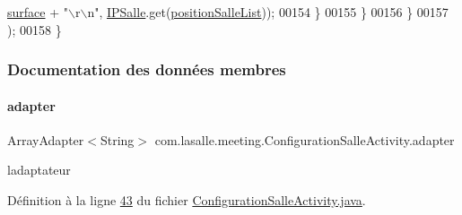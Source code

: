 \begin{DoxyCode}
      \hyperlink{classcom_1_1lasalle_1_1meeting_1_1_configuration_salle_activity_a3d27df453e9f461eb7402a8f69ca7ae1}{surface} + \textcolor{stringliteral}{"\(\backslash\)r\(\backslash\)n"}, \hyperlink{classcom_1_1lasalle_1_1meeting_1_1_configuration_salle_activity_a74bb868ae39746bae6533c1735207abf}{IPSalle}.get(\hyperlink{classcom_1_1lasalle_1_1meeting_1_1_configuration_salle_activity_ae76edfdd5b57cd474cccb830950f864a}{positionSalleList}));
00154                     \}
00155                 \}
00156             \}
00157         );
00158     \}
\end{DoxyCode}


\subsubsection{Documentation des données membres}
\mbox{\label{classcom_1_1lasalle_1_1meeting_1_1_configuration_salle_activity_a168dba575f6638ba8c9081dad1b55a6e}} 
\paragraph{\texorpdfstring{adapter}{adapter}}
{\footnotesize\ttfamily Array\+Adapter$<$String$>$ com.\+lasalle.\+meeting.\+Configuration\+Salle\+Activity.\+adapter\hspace{0.3cm}{\ttfamily [private]}}



l\textquotesingle{}adaptateur 



Définition à la ligne \hyperlink{_configuration_salle_activity_8java_source_l00043}{43} du fichier \hyperlink{_configuration_salle_activity_8java_source}{Configuration\+Salle\+Activity.\+java}.

\mbox{\label{classcom_1_1lasalle_1_1meeting_1_1_configuration_salle_activity_a1222b15c71483d1b48ed0eb78724db91}} 

